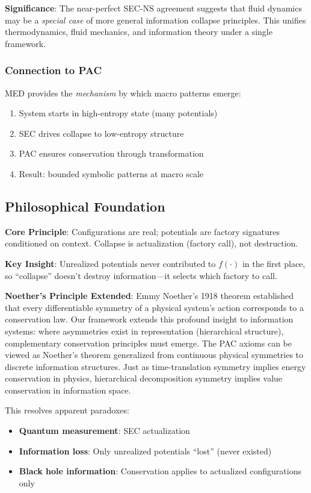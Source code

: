 \documentclass[11pt,a4paper]{article}
\begin{document}
\textbf{Significance}: The near-perfect SEC-NS agreement suggests that fluid dynamics may be a \emph{special case} of more general information collapse principles. This unifies thermodynamics, fluid mechanics, and information theory under a single framework.

\subsubsection{Connection to PAC}

MED provides the \emph{mechanism} by which macro patterns emerge:
\begin{enumerate}
    \item System starts in high-entropy state (many potentials)
    \item SEC drives collapse to low-entropy structure
    \item PAC ensures conservation through transformation
    \item Result: bounded symbolic patterns at macro scale
\end{enumerate}

\subsection{Philosophical Foundation}

\textbf{Core Principle}: Configurations are real; potentials are factory signatures conditioned on context. Collapse is actualization (factory call), not destruction.

\textbf{Key Insight}: Unrealized potentials never contributed to $f(\cdot)$ in the first place, so ``collapse'' doesn't destroy information---it selects which factory to call.

\textbf{Noether's Principle Extended}: Emmy Noether's 1918 theorem established that every differentiable symmetry of a physical system's action corresponds to a conservation law. Our framework extends this profound insight to information systems: where asymmetries exist in representation (hierarchical structure), complementary conservation principles must emerge. The PAC axioms can be viewed as Noether's theorem generalized from continuous physical symmetries to discrete information structures. Just as time-translation symmetry implies energy conservation in physics, hierarchical decomposition symmetry implies value conservation in information space.

This resolves apparent paradoxes:
\begin{itemize}
    \item \textbf{Quantum measurement}: SEC actualization
    \item \textbf{Information loss}: Only unrealized potentials ``lost'' (never existed)
    \item \textbf{Black hole information}: Conservation applies to actualized configurations only
\end{itemize}
\end{document}
